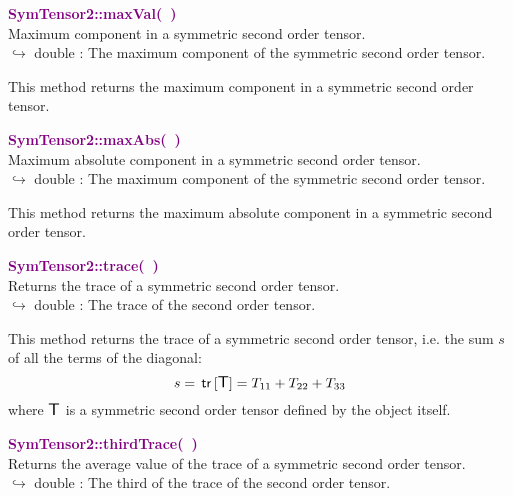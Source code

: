 \textcolor{purple}{\textbf{SymTensor2::maxVal(~)}}\label{SymTensor2::maxVal()}\\
Maximum component in a symmetric second order tensor.\\ \hspace*{10mm}$\hookrightarrow$ double : The maximum component of the symmetric second order tensor.

This method returns the maximum component in a symmetric second order tensor.

\textcolor{purple}{\textbf{SymTensor2::maxAbs(~)}}\label{SymTensor2::maxAbs()}\\
Maximum absolute component in a symmetric second order tensor.\\ \hspace*{10mm}$\hookrightarrow$ double : The maximum component of the symmetric second order tensor.

This method returns the maximum absolute component in a symmetric second order tensor.

\textcolor{purple}{\textbf{SymTensor2::trace(~)}}\label{SymTensor2::trace()}\\
Returns the trace of a symmetric second order tensor.\\ \hspace*{10mm}$\hookrightarrow$ double : The trace of the second order tensor.

This method returns the trace of a symmetric second order tensor, i.e. the sum $s$ of all the terms of the diagonal:
\begin{equation*}
s = \mbox{\ensuremath{\mathsf{\,tr\,}}}[\mbox{\large\ensuremath{\mathsf{T}}}] = T_{11}+T_{22}+T_{33}
\end{equation*}
where $\mbox{\large\ensuremath{\mathsf{T}}}$ is a symmetric second order tensor defined by the object itself.

\textcolor{purple}{\textbf{SymTensor2::thirdTrace(~)}}\label{SymTensor2::thirdTrace()}\\
Returns the average value of the trace of a symmetric second order tensor.\\ \hspace*{10mm}$\hookrightarrow$ double : The third of the trace of the second order tensor.

